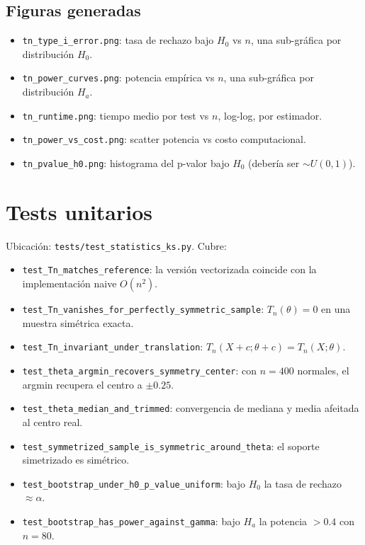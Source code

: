 \documentclass[11pt,a4paper]{article}
\begin{document}
\subsection{Figuras generadas}

\begin{itemize}[leftmargin=*]
    \item \texttt{tn\_type\_i\_error.png}: tasa de rechazo bajo $H_0$ vs $n$, una sub-gráfica por distribución $H_0$.
    \item \texttt{tn\_power\_curves.png}: potencia empírica vs $n$, una sub-gráfica por distribución $H_a$.
    \item \texttt{tn\_runtime.png}: tiempo medio por test vs $n$, log-log, por estimador.
    \item \texttt{tn\_power\_vs\_cost.png}: scatter potencia vs costo computacional.
    \item \texttt{tn\_pvalue\_h0.png}: histograma del p-valor bajo $H_0$ (debería ser ${\sim}U(0,1)$).
\end{itemize}

\section{Tests unitarios}

Ubicación: \texttt{tests/test\_statistics\_ks.py}. Cubre:

\begin{itemize}[leftmargin=*]
    \item \texttt{test\_Tn\_matches\_reference}: la versión vectorizada coincide con la implementación naive $O(n^2)$.
    \item \texttt{test\_Tn\_vanishes\_for\_perfectly\_symmetric\_sample}: $T_n(\theta) = 0$ en una muestra simétrica exacta.
    \item \texttt{test\_Tn\_invariant\_under\_translation}: $T_n(X+c; \theta+c) = T_n(X; \theta)$.
    \item \texttt{test\_theta\_argmin\_recovers\_symmetry\_center}: con $n=400$ normales, el argmin recupera el centro a $\pm 0.25$.
    \item \texttt{test\_theta\_median\_and\_trimmed}: convergencia de mediana y media afeitada al centro real.
    \item \texttt{test\_symmetrized\_sample\_is\_symmetric\_around\_theta}: el soporte simetrizado es simétrico.
    \item \texttt{test\_bootstrap\_under\_h0\_p\_value\_uniform}: bajo $H_0$ la tasa de rechazo $\approx \alpha$.
    \item \texttt{test\_bootstrap\_has\_power\_against\_gamma}: bajo $H_a$ la potencia $> 0.4$ con $n=80$.
\end{itemize}
\end{document}
